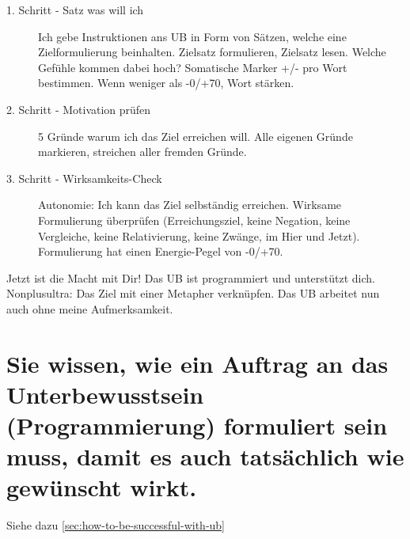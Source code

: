 \begin{description}
	\item[1. Schritt - Satz was will ich] Ich gebe Instruktionen ans UB in Form von Sätzen, welche eine Zielformulierung beinhalten. Zielsatz formulieren, Zielsatz lesen. Welche Gefühle kommen dabei hoch? Somatische Marker +/- pro Wort bestimmen. Wenn weniger als -0/+70, Wort stärken.
	\item[2. Schritt - Motivation prüfen] 5 Gründe warum ich das Ziel erreichen will. Alle eigenen Gründe markieren, streichen aller fremden Gründe.
	\item[3. Schritt - Wirksamkeits-Check] Autonomie: Ich kann das Ziel selbständig erreichen. Wirksame Formulierung überprüfen (Erreichungsziel, keine Negation, keine Vergleiche, keine Relativierung, keine Zwänge, im Hier und Jetzt). Formulierung hat einen Energie-Pegel von -0/+70. 
\end{description}

Jetzt ist die Macht mit Dir! Das UB ist programmiert und unterstützt dich.
Nonplusultra: Das Ziel mit einer Metapher verknüpfen. Das UB arbeitet nun auch ohne meine Aufmerksamkeit.

\section{Sie wissen, wie ein Auftrag an das Unterbewusstsein (Programmierung) formuliert sein muss, damit es auch tatsächlich wie gewünscht wirkt.}

Siehe dazu \ref{sec:how-to-be-successful-with-ub}
